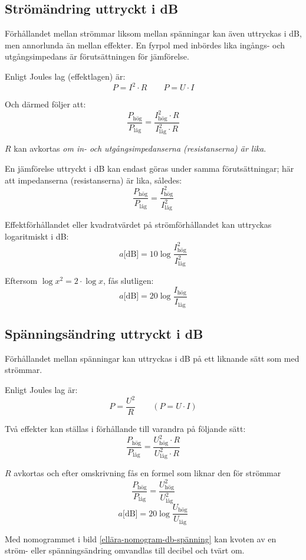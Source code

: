 \subsection{Strömändring uttryckt i dB}

Förhållandet mellan strömmar liksom mellan spänningar kan även uttryckas i dB,
men annorlunda än mellan effekter.
En fyrpol med inbördes lika ingångs- och utgångsimpedans är förutsättningen för
jämförelse.

Enligt Joules lag (effektlagen) är: 
\[P = I^2 \cdot R \qquad P = U \cdot I\]

Och därmed följer att:
\[\dfrac{P_\text{hög}}{P_\text{l{\aa}g}} = 
\dfrac{I_\text{hög}^2 \cdot R}{I_\text{låg}^2 \cdot R}\]

$R$ kan avkortas \emph{om in- och utgångsimpedanserna (resistanserna) är lika}.

En jämförelse uttryckt i dB kan endast göras under samma förutsättningar;
här att impedanserna (resistanserna) är lika, således:
\[\dfrac{P_\text{hög}}{P_\text{låg}} = \dfrac{I_\text{hög}^2}{I_\text{låg}^2}\]

Effektförhållandet eller kvadratvärdet på strömförhållandet kan uttryckas
logaritmiskt i dB:
\[a\text{[dB]} = 10\log \dfrac{I_\text{hög}^2}{I_\text{låg}^2}\]

Eftersom \(\log x^2 = 2 \cdot \log x\), fås slutligen:
\[a\text{[dB]} = 20\log \dfrac{I_\text{hög}}{I_\text{låg}}\]

\subsection{Spänningsändring uttryckt i dB}

Förhållandet mellan spänningar kan uttryckas i dB på ett liknande sätt som med
strömmar.

Enligt Joules lag är:
\[P = \frac{U^2}{R} \qquad (P = U \cdot I)\]

Två effekter kan ställas i förhållande till varandra på följande sätt:
\[
\frac{P_\text{hög}}{P_\text{låg}}=
\frac{U_\text{hög}^2 \cdot R}{U_\text{låg}^2 \cdot R}
\]

\(R\) avkortas och efter omskrivning fås en formel som liknar den för strömmar
\[
	\dfrac{P_\text{hög}}{P_\text{låg}} = \dfrac{U_\text{hög}^2}{U_\text{låg}^2}
\]
\[
	a\text{[dB]} = 20\log \dfrac{U_\text{hög}}{U_\text{låg}}
\]

Med nomogrammet i bild \ref{ellära-nomogram-db-spänning} kan kvoten av en
ström- eller spänningsändring omvandlas till decibel och tvärt om.

